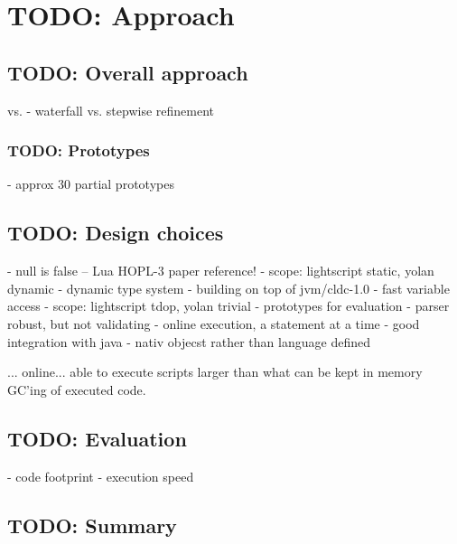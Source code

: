 \chapter{TODO: Approach}
\section{TODO: Overall approach}
\cite{waterfall} vs. \cite{stepwise-refinement}
    - waterfall vs. stepwise refinement
\subsection{TODO: Prototypes}
    - approx 30 partial prototypes
\section{TODO: Design choices}
    - null is false -- Lua HOPL-3 paper reference!
    - scope: lightscript static, yolan dynamic
    - dynamic type system
    - building on top of jvm/cldc-1.0
    - fast variable access
    - scope: lightscript tdop, yolan trivial
    - prototypes for evaluation
    - parser robust, but not validating
    - online execution, a statement at a time
    - good integration with java - nativ objecst rather than language defined

... online... able to execute scripts larger than what can be kept in memory
GC'ing of executed code.
\section{TODO: Evaluation}
    - code footprint
    - execution speed
\section{TODO: Summary}
